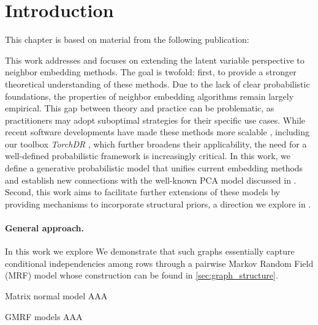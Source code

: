 \section{Introduction}\label{intro}


This chapter is based on material from the following publication:

\begin{mdframed}
\begin{center} 
\end{center}
\end{mdframed}


This work addresses  and focuses on extending the latent variable perspective to neighbor embedding methods. The goal is twofold: first, to provide a stronger theoretical understanding of these methods. Due to the lack of clear probabilistic foundations, the properties of neighbor embedding algorithms remain largely empirical. This gap between theory and practice can be problematic, as practitioners may adopt suboptimal strategies for their specific use cases.  
While recent software developments have made these methods more scalable \citep{chan2018t,pezzotti2019gpgpu,linderman2019fast}, including our toolbox \emph{TorchDR} \citep{vanassel2024torchdr}, which further broadens their applicability, the need for a well-defined probabilistic framework is increasingly critical.  
In this work, we define a generative probabilistic model that unifies current embedding methods and establish new connections with the well-known PCA model discussed in .  
Second, this work aims to facilitate further extensions of these models by providing mechanisms to incorporate structural priors, a direction we explore in .

\paragraph{General approach.}
In this work we explore We demonstrate that such graphs essentially capture conditional independencies among rows through a pairwise Markov Random Field (MRF) model whose construction can be found in \cref{sec:graph_structure}. 

\begin{mem1}{Matrix normal model}\label{memo:matrix_normal}
    AAA
\end{mem1}

\begin{mem1}{GMRF models}
    AAA
\end{mem1}


